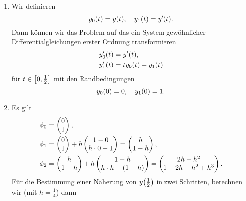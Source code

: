 \documentclass{exercise}
\begin{document}
	\section{}

	\begin{enumerate}
		\item Wir definieren
		\[
			y_0\parentheses*{t} = y\parentheses*{t}, \quad y_1\parentheses*{t} = y'\parentheses*{t}.
		\]
		Dann können wir das Problem auf das ein System gewöhnlicher Differentialgleichungen erster Ordnung transformieren
		\begin{align*}
			y_0'\parentheses*{t} &= y'\parentheses*{t},\\
			y_1'\parentheses*{t} &= ty_0\parentheses*{t} - y_1\parentheses*{t}
		\end{align*}
		für \(t \in \brackets*{0, \frac{1}{2}}\) mit den Randbedingungen
		\[
			y_0\parentheses*{0} = 0, \quad y_1\parentheses*{0} = 1.
		\]
		\item Es gilt
		\begin{align*}
			\phi_0 &= \begin{pmatrix}
				0\\
				1
			\end{pmatrix},\\
			\phi_1 &= \begin{pmatrix}
				0\\
				1
			\end{pmatrix} + h\begin{pmatrix}
				1 - 0\\
				h \cdot 0 - 1
			\end{pmatrix} = \begin{pmatrix}
				h\\
				1 - h
			\end{pmatrix},\\
			\phi_2 &= \begin{pmatrix}
				h\\
				1 - h
			\end{pmatrix} + h\begin{pmatrix}
				1 - h\\
				h \cdot h - \parentheses*{1 - h}
			\end{pmatrix} = \begin{pmatrix}
				2h - h^2\\
				1 - 2h + h^2 + h^3
			\end{pmatrix}.
		\end{align*}
		Für die Bestimmung einer Näherung von \(y\parentheses*{\frac{1}{2}}\) in zwei Schritten, berechnen wir (mit \(h = \frac{1}{4}\)) dann

\end{enumerate}
\end{document}
